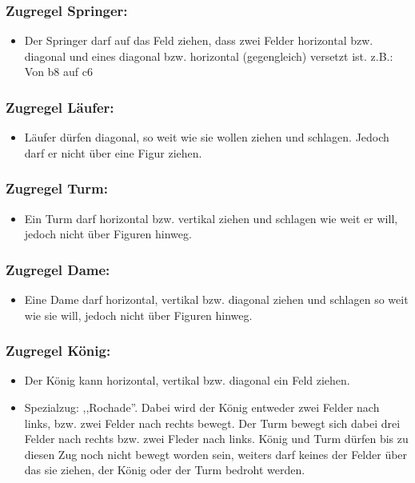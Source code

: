 \documentclass[12pt,a4paper]{article}
\begin{document}
{\subsubsection{Zugregel Springer:}
\begin{itemize}
	\item{Der Springer darf auf das Feld ziehen, dass zwei Felder horizontal bzw. diagonal und eines diagonal bzw. horizontal (gegengleich) versetzt ist. z.B.: Von  b8 auf c6}
\end{itemize}
\subsubsection{Zugregel Läufer:}
\begin{itemize}
	\item{Läufer dürfen diagonal, so weit wie sie wollen ziehen und schlagen. Jedoch darf er nicht über eine Figur ziehen.}
\end{itemize}

\subsubsection{Zugregel Turm:}
\begin{itemize}
	\item{Ein Turm darf horizontal bzw. vertikal ziehen und schlagen wie weit er will, jedoch nicht über Figuren hinweg.}
\end{itemize}

\subsubsection{Zugregel Dame:}
\begin{itemize}
	\item{Eine Dame darf horizontal, vertikal bzw. diagonal ziehen und schlagen so weit wie sie will, jedoch nicht über Figuren hinweg.}
\end{itemize}

\subsubsection{Zugregel König:}
\begin{itemize}
	\item{Der König kann horizontal, vertikal bzw. diagonal ein Feld ziehen.}
	\item{Spezialzug: ,,Rochade''. Dabei wird der König entweder zwei Felder nach links, bzw. zwei Felder nach rechts bewegt. Der Turm bewegt sich dabei drei Felder nach rechts bzw. zwei Fleder nach links. König und Turm dürfen bis zu diesen Zug noch nicht bewegt worden sein, weiters darf keines der Felder über das sie ziehen, der König oder der Turm bedroht werden.}
\end{itemize}


}
\end{document}
